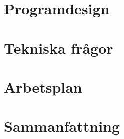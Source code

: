 \documentclass[a4paper, 11pt]{article}
\begin{document}


\section{Programdesign}
\label{sec:design}



\vspace{12pt}



\vspace{12pt}



\section{Tekniska frågor}
\label{sec:qa}



\vspace{12pt}



\vspace{12pt}



\section{Arbetsplan}
\label{sec:arbplan}



\vspace{12pt}



\vspace{12pt}



\section{Sammanfattning}
\end{document}
